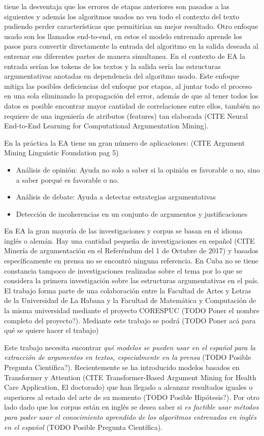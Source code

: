 tiene la desventaja que los errores de etapas anteriores son pasados a las siguientes y además los algoritmos
usados no ven todo el contexto del texto pudiendo perder características que permitirían un mejor resultado.
Otro enfoque usado son los llamados end-to-end, en estos el modelo entrenado aprende los pasos para convertir
directamente la entrada del algoritmo en la salida deseada al entrenar sus diferentes partes de manera 
simultanea. En el contexto de EA la entrada serían los tokens de los textos y la salida sería las
estructuras argumentativas anotadas en dependencia del algoritmo usado. Este enfoque mitiga las posibles
deficiencias del enfoque por etapas, al juntar todo el proceso en una sola eliminando la propagación
del error, además de que al tener todos los datos es posible encontrar mayor cantidad de correlaciones 
entre ellos, también no requiere de una ingeniería de atributos (features) tan elaborada (CITE Neural End-to-End Learning for Computational Argumentation Mining).

En la práctica la EA tiene un gran número de aplicaciones: (CITE Argument Mining Linguistic Foundation pag 5)
\begin{itemize}
    \item Análisis de opinión: Ayuda no solo a saber si la opinión es favorable o no, sino a saber
    porqué es favorable o no.
    \item Análisis de debate: Ayuda a detectar estrategias argumentativas
    \item Detección de incoherencias en un conjunto de argumentos y justificaciones
\end{itemize}


En EA la gran mayoría de las investigaciones y corpus se basan en el idioma inglés o alemán. Hay
una cantidad pequeña de investigaciones en español (CITE Minería de argumentación en el Referéndum del 1 de Octubre de 2017) 
y basados específicamente en prensa no se encontró ninguna referencia. En Cuba no se tiene constancia
tampoco de investigaciones realizadas sobre el tema por lo que se considera la primera investigación
sobre las estructuras argumentativas en el país. El trabajo forma parte de una colaboración entre la 
Facultad de Artes y Letras de la Universidad de La Habana y la Facultad de Matemática y Computación 
de la misma universidad mediante el proyecto CORESPUC (TODO Poner el nombre completo del proyecto?).
Mediante este trabajo se podrá (TODO Poner acá para qué se quiere hacer el trabajo)


Este trabajo necesita encontrar \emph{qué modelos se pueden usar en el español para la extracción de 
argumentos en textos, especialmente en la prensa} (TODO Posible Pregunta Científica?). Recientemente se ha introducido modelos basados 
en Transformer y Attention (CITE Transformer-Based Argument Mining for Health Care Application, El doctorado)
que han llegado a alcanzar resultados iguales o superiores al estado del arte de su momento (TODO Posible Hipótesis?). 
Por otro lado dado que los corpus están en inglés se desea saber si \emph{es factible usar métodos
para poder usar el conocimiento aprendido de los algoritmos entrenados en inglés en el español} 
(TODO Posible Pregunta Científica).


